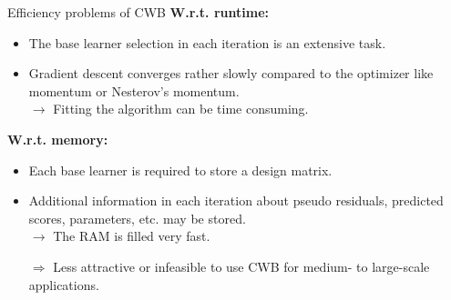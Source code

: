 \documentclass[t,10pt]{beamer}
\begin{document}
\begin{frame}{Efficiency problems of CWB}
    \textbf{W.r.t. runtime:}
    \begin{itemize}
        \item 
            The base learner selection in each iteration is an extensive task.%
        \item
            Gradient descent converges rather slowly compared to the optimizer like momentum or Nesterov's momentum.\\[0.2cm]
            $\rightarrow$ Fitting the algorithm can be time consuming.
    \end{itemize}
    \textbf{W.r.t. memory:}  
    \begin{itemize}
    \item 
        Each base learner is required to store a design matrix.
    \item 
        Additional information in each iteration about pseudo residuals, predicted scores, parameters, etc. may be stored.\\[0.2cm]
        $\rightarrow$ The RAM is filled very fast.
  \end{itemize}
  \begin{itemize}
    \item[$\Rightarrow$] Less attractive or infeasible to use CWB for medium- to large-scale applications.
  \end{itemize}
\end{frame}
\end{document}
